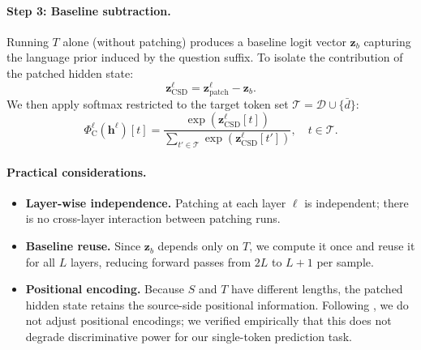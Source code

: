 \paragraph{Step 3: Baseline subtraction.}
Running $T$ alone (without patching) produces a baseline logit vector $\mathbf{z}_b$ capturing the language prior induced by the question suffix.
To isolate the contribution of the patched hidden state:
\begin{equation}
\label{eq:csd_subtract}
\mathbf{z}_{\mathrm{CSD}}^\ell = \mathbf{z}_{\mathrm{patch}}^\ell - \mathbf{z}_b.
\end{equation}
We then apply softmax restricted to the target token set $\mathcal{T} = \mathcal{D} \cup \{\bar{d}\}$:
\begin{equation}
\label{eq:csd_distribution}
\Phi_{\mathrm{C}}^\ell(\mathbf{h}^\ell)[t] = \frac{\exp(\mathbf{z}_{\mathrm{CSD}}^\ell[t])}{\sum_{t' \in \mathcal{T}} \exp(\mathbf{z}_{\mathrm{CSD}}^\ell[t'])}, \quad t \in \mathcal{T}.
\end{equation}

\paragraph{Practical considerations.}

\begin{itemize}
    \item \textbf{Layer-wise independence.} Patching at each layer $\ell$ is independent; there is no cross-layer interaction between patching runs.

    \item \textbf{Baseline reuse.} Since $\mathbf{z}_b$ depends only on $T$, we compute it once and reuse it for all $L$ layers, reducing forward passes from $2L$ to $L{+}1$ per sample.

    \item \textbf{Positional encoding.} Because $S$ and $T$ have different lengths, the patched hidden state retains the source-side positional information. Following \citet{ghandeharioun2024patchscopes}, we do not adjust positional encodings; we verified empirically that this does not degrade discriminative power for our single-token prediction task.
\end{itemize}
